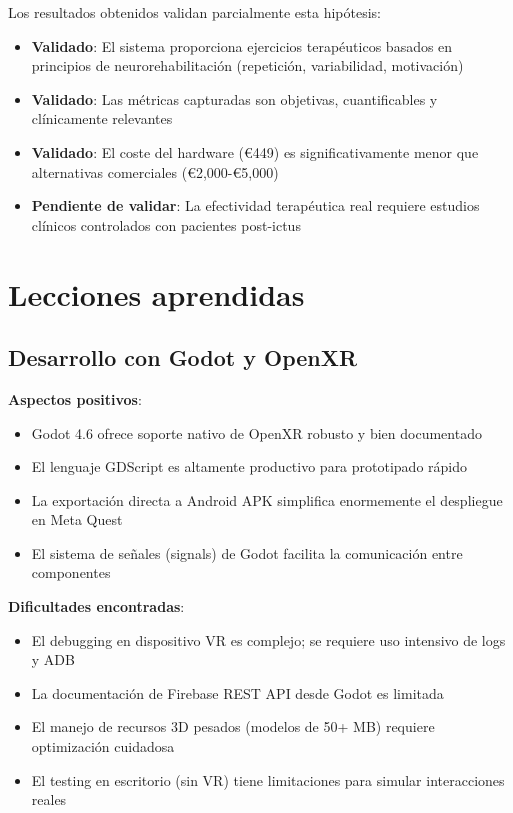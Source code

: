 Los resultados obtenidos validan parcialmente esta hipótesis:

\begin{itemize}
    \item \textbf{Validado}: El sistema proporciona ejercicios terapéuticos basados en principios de neurorehabilitación (repetición, variabilidad, motivación)
    \item \textbf{Validado}: Las métricas capturadas son objetivas, cuantificables y clínicamente relevantes
    \item \textbf{Validado}: El coste del hardware (€449) es significativamente menor que alternativas comerciales (€2,000-€5,000)
    \item \textbf{Pendiente de validar}: La efectividad terapéutica real requiere estudios clínicos controlados con pacientes post-ictus
\end{itemize}

\section{Lecciones aprendidas}

\subsection{Desarrollo con Godot y OpenXR}

\textbf{Aspectos positivos}:
\begin{itemize}
    \item Godot 4.6 ofrece soporte nativo de OpenXR robusto y bien documentado
    \item El lenguaje GDScript es altamente productivo para prototipado rápido
    \item La exportación directa a Android APK simplifica enormemente el despliegue en Meta Quest
    \item El sistema de señales (signals) de Godot facilita la comunicación entre componentes
\end{itemize}

\textbf{Dificultades encontradas}:
\begin{itemize}
    \item El debugging en dispositivo VR es complejo; se requiere uso intensivo de logs y ADB
    \item La documentación de Firebase REST API desde Godot es limitada
    \item El manejo de recursos 3D pesados (modelos de 50+ MB) requiere optimización cuidadosa
    \item El testing en escritorio (sin VR) tiene limitaciones para simular interacciones reales
\end{itemize}

